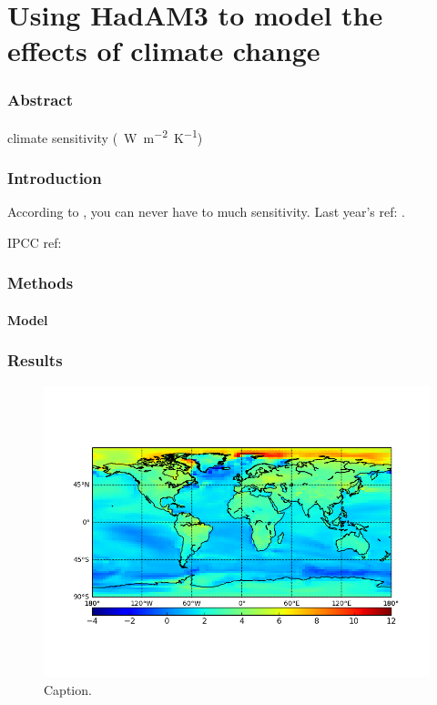 \documentclass{article}
\begin{document}
\part*{Using HadAM3 to model the effects of climate change}

\section*{Abstract}

 climate sensitivity (\SI{}{W.m^{-2}.K^{-1}})

\section{Introduction}

According to \textcite{gregory2004new}, you can never have to much sensitivity. Last year's ref: \parencite{geogg134merit}.

IPCC ref: \parencite{WG1AR5_Chapter02_FINAL}

\section{Methods}

\subsection{Model}

\section{Results}

\begin{figure}[hbp]
    \centering
    \includegraphics[width=\textwidth]{figures/figure_1}
    \caption{Caption.}
    \label{fig:figure_1}
\end{figure}
\end{document}
